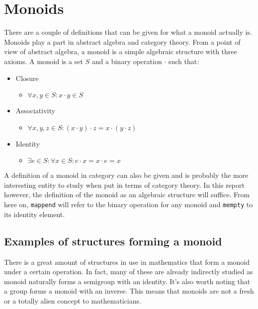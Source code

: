 \documentclass{acm_proc_article-sp}
\begin{document}
\section{Monoids}
There are a couple of definitions that can be given for what a monoid
actually is. Monoids play a part in abstract algebra and category
theory. From a point of view of abstract algebra, a monoid is a simple
algebraic structure with three axioms. A monoid is a set $S$ and a
binary operation $\cdot$ such that:
\begin{itemize}
\item Closure
  \begin{itemize}
  \item $\forall x,y \in S: x \cdot y \in S$
  \end{itemize}
\item Associativity
  \begin{itemize}
  \item $\forall x,y,z \in S: (x \cdot y) \cdot z = x \cdot (y
    \cdot z)$
  \end{itemize}
\item Identity
  \begin{itemize}
  \item $\exists e \in S: \forall x \in S: e \cdot x = x \cdot e
    = x$
  \end{itemize}
\end{itemize}
A definition of a monoid in category can also be given and is
probably the more interesting entity to study when put in terms of
category theory. In this report however, the definition of the monoid
as an algebraic structure will suffice. From here on, \texttt{mappend} will
refer to the binary operation for any monoid and \texttt{mempty} to its
identity element.
\subsection{Examples of structures forming a monoid}
There is a great amount of structures in use in mathematics that form
a monoid under a certain operation. In fact, many of these are already
indirectly studied as monoid naturally forms a semigroup with an
identity. It's also worth noting that a group forms a monoid with an
inverse. This means that monoids are not a fresh or a totally alien
concept to mathematicians.
\end{document}
